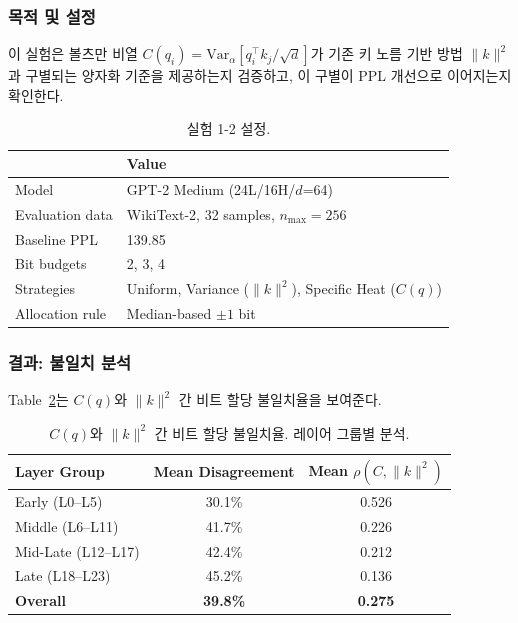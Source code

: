 \documentclass[11pt,a4paper]{article}
\begin{document}
\subsubsection{목적 및 설정}

이 실험은 볼츠만 비열 $C(q_i) = \mathrm{Var}_\alpha[q_i^\top k_j / \sqrt{d}]$가 기존 키 노름 기반 방법 $\|k\|^2$과 구별되는 양자화 기준을 제공하는지 검증하고, 이 구별이 PPL 개선으로 이어지는지 확인한다.

\begin{table}[H]
\centering
\caption{실험 1-2 설정.}
\label{tab:exp12_setup}
\begin{tabular}{ll}
\toprule
\textbf{} & \textbf{Value} \\
\midrule
Model & GPT-2 Medium (24L/16H/$d$=64) \\
Evaluation data & WikiText-2, 32 samples, $n_\mathrm{max}=256$ \\
Baseline PPL & 139.85 \\
Bit budgets & 2, 3, 4 \\
Strategies & Uniform, Variance ($\|k\|^2$), Specific Heat ($C(q)$) \\
Allocation rule & Median-based $\pm 1$ bit \\
\bottomrule
\end{tabular}
\end{table}

\subsubsection{결과: 불일치 분석}

Table~\ref{tab:disagree}는 $C(q)$와 $\|k\|^2$ 간 비트 할당 불일치율을 보여준다.

\begin{table}[H]
\centering
\caption{$C(q)$와 $\|k\|^2$ 간 비트 할당 불일치율. 레이어 그룹별 분석.}
\label{tab:disagree}
\begin{tabular}{lcc}
\toprule
\textbf{Layer Group} & \textbf{Mean Disagreement} & \textbf{Mean $\rho(C, \|k\|^2)$} \\
\midrule
Early (L0--L5) & 30.1\% & 0.526 \\
Middle (L6--L11) & 41.7\% & 0.226 \\
Mid-Late (L12--L17) & 42.4\% & 0.212 \\
Late (L18--L23) & 45.2\% & 0.136 \\
\midrule
\textbf{Overall} & \textbf{39.8\%} & \textbf{0.275} \\
\bottomrule
\end{tabular}
\end{table}
\end{document}
